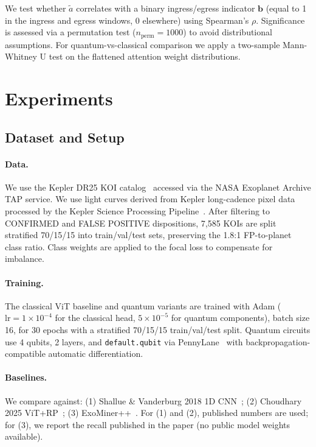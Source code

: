 \documentclass{article}
\begin{document}
We test whether $\tilde{a}$ correlates with a binary ingress/egress
indicator $\mathbf{b}$ (equal to 1 in the ingress and egress windows, 0
elsewhere) using Spearman's $\rho$.
Significance is assessed via a permutation test ($n_\text{perm} = 1000$) to
avoid distributional assumptions.
For quantum-vs-classical comparison we apply a two-sample Mann-Whitney U test
on the flattened attention weight distributions.

\section{Experiments}
\label{sec:experiments}

\subsection{Dataset and Setup}

\paragraph{Data.}
We use the Kepler DR25 KOI catalog~\citep{thompson2018} accessed via the NASA
Exoplanet Archive TAP service.
We use light curves derived from Kepler long-cadence pixel data processed by
the Kepler Science Processing Pipeline~\citep{jenkins2010pipeline,jenkins2010lc}.
After filtering to CONFIRMED and FALSE POSITIVE dispositions,
7,585 KOIs are split stratified 70/15/15 into train/val/test sets,
preserving the 1.8:1 FP-to-planet class ratio.
Class weights are applied to the focal loss to compensate for imbalance.

\paragraph{Training.}
The classical ViT baseline and quantum variants are trained with Adam
($\text{lr} = 1 \times 10^{-4}$ for the classical head,
$5 \times 10^{-5}$ for quantum components), batch size 16, for 30 epochs with
a stratified 70/15/15 train/val/test split.
Quantum circuits use 4 qubits, 2 layers, and \texttt{default.qubit} via
PennyLane~\citep{bergholm2018} with backpropagation-compatible automatic
differentiation.

\paragraph{Baselines.}
We compare against: (1) Shallue \& Vanderburg 2018 1D CNN~\citep{shallue2018};
(2) Choudhary 2025 ViT+RP~\citep{choudhary2025};
(3) ExoMiner++~\citep{exominerplusplus2025}.
For (1) and (2), published numbers are used; for (3), we report the
recall published in the paper (no public model weights available).
\end{document}

